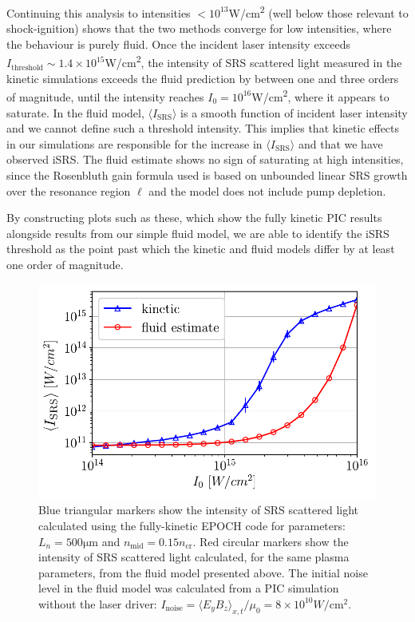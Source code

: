 Continuing this analysis to intensities $<10^{13}$\si{W/\centi\metre^2} (well below those relevant to shock-ignition) shows that the two methods converge for low intensities, where the behaviour is purely fluid. Once the incident laser intensity exceeds  $I_\mathrm{threshold} \sim 1.4\times10^{15}$\si{W/\centi\metre^2}, the intensity of SRS scattered light measured in the kinetic simulations exceeds the fluid prediction by between one and three orders of magnitude, until the intensity reaches $I_0 = 10^{16}$\si{W/\centi\metre^2}, where it appears to saturate. In the fluid model, $\langle I_{\mathrm{SRS}}\rangle$ is a smooth function of incident laser intensity and we cannot define such a threshold intensity. This implies that kinetic effects in our simulations are responsible for the increase in $\langle I_{\mathrm{SRS}} \rangle$ and that we have observed iSRS. The fluid estimate shows no sign of saturating at high intensities, since the Rosenbluth gain formula used is based on unbounded linear SRS growth over the resonance region $\ell$ and the model does not include pump depletion.

By constructing plots such as these, which show the fully kinetic PIC results alongside results from our simple fluid model, we are able to identify the iSRS threshold as the point past which the kinetic and fluid models differ by at least one order of magnitude.


\begin{figure}[ht]
    \centering
    \includegraphics[width=0.9\columnwidth]{Chapters/C4_iSRS/fig2.pdf}
    \caption{
        Blue triangular markers show the intensity of SRS scattered light calculated using the fully-kinetic EPOCH code for parameters: $L_n = 500 \si{\micro\metre} $ and $n_{\mathrm{mid}} = 0.15n_\mathrm{cr}$.
        Red circular markers show the intensity of SRS scattered light calculated, for the same plasma parameters, from the fluid model presented above.
        The initial noise level in the fluid model was calculated from a PIC simulation without the laser driver: $I_\mathrm{noise}=\langle E_yB_z\rangle_{x,t} / \mu_0 = 8\times 10^{10} \si{W/\centi\metre^2}$.}
    \label{fig:kineticVsfluid}
\end{figure}{}

